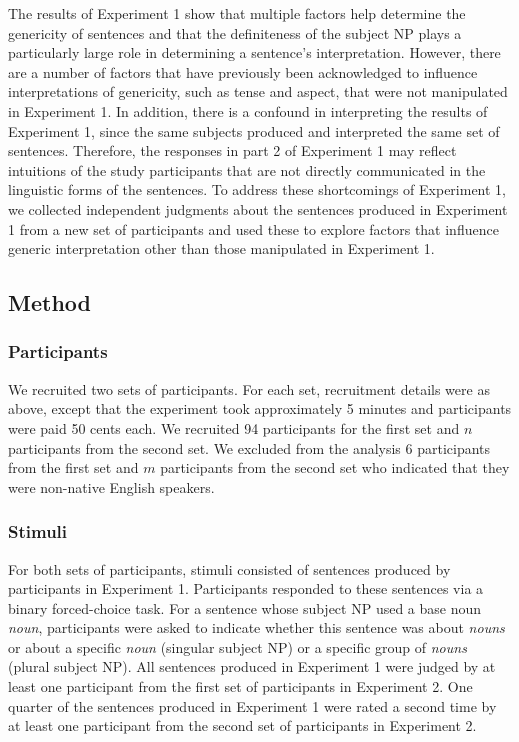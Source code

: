 \documentclass[10pt,letterpaper]{article}
\begin{document}
The results of Experiment 1 show that multiple factors help determine the genericity of sentences and that the definiteness of the subject NP plays a particularly large role in determining a sentence's interpretation. However, there are a number of factors that have previously been acknowledged to influence interpretations of genericity, such as tense and aspect, that were not manipulated in Experiment 1. In addition, there is a confound in interpreting the results of Experiment 1, since the same subjects produced and interpreted the same set of sentences. Therefore, the responses in part 2 of Experiment 1 may reflect intuitions of the study participants that are not directly communicated in the linguistic forms of the sentences. To address these shortcomings of Experiment 1, we collected independent judgments about the sentences produced in Experiment 1 from a new set of participants and used these to explore factors that influence generic interpretation other than those manipulated in Experiment 1.

\subsection{Method}

\subsubsection{Participants}

We recruited two sets of participants. For each set, recruitment details were as above, except that the experiment took approximately 5 minutes and participants were paid 50 cents each. We recruited 94 participants for the first set and \(n\) participants from the second set. We excluded from the analysis 6 participants from the first set and \(m\) participants from the second set who indicated that they were non-native English speakers.

\subsubsection{Stimuli}

For both sets of participants, stimuli consisted of sentences produced by participants in Experiment 1. Participants responded to these sentences via a binary forced-choice task. For a sentence whose subject NP used a base noun \textit{noun}, participants were asked to indicate whether this sentence was about \textit{nouns} or about a specific \textit{noun} (singular subject NP) or a specific group of \textit{nouns} (plural subject NP). All sentences produced in Experiment 1 were judged by at least one participant from the first set of participants in Experiment 2. One quarter of the sentences produced in Experiment 1 were rated a second time by at least one participant from the second set of participants in Experiment 2.
\end{document}
